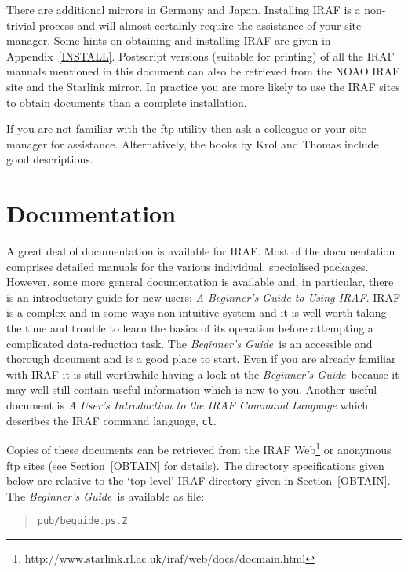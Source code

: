 \documentclass[twoside,11pt]{article}
\newcommand{\htmladdnormallinkfoot}[2]{#1\footnote{#2}}
\newcommand{\htmladdnormallink}[2]{#1}
\newcommand{\xlabel}[1]{}
\begin{document}
There are additional mirrors in Germany and Japan.
Installing IRAF is a non-trivial process and will almost certainly
require the assistance of your site manager.  Some hints on obtaining
and installing IRAF are given in Appendix~\ref{INSTALL}.  Postscript
versions (suitable for printing) of all the IRAF manuals mentioned in
this document can also be retrieved from the NOAO IRAF site and the
Starlink mirror.  In practice you are more likely to use the IRAF sites
to obtain documents than a complete installation.

If you are not familiar with the ftp utility then ask a colleague or
your site manager for assistance.  Alternatively, the books by
Krol\cite{KROL92} and Thomas\cite{THOMAS95} include good descriptions.


\section{\xlabel{DOC}\label{DOC}Documentation}

A great deal of \htmladdnormallink{documentation}
{http://iraf.noao.edu/iraf/web/docs/docmain.html}
is available for IRAF.  Most of the
documentation comprises detailed manuals for the various individual,
specialised packages.  However, some more general documentation is
available and, in particular, there is an introductory guide for new
users: {\it A Beginner's Guide to Using IRAF}\/\cite{BARNES93}.
IRAF is a complex and in some ways non-intuitive system and it is well
worth taking the time and trouble to learn the basics of its operation
before attempting a complicated data-reduction task.  The {\it
Beginner's Guide}\, is an accessible and thorough document and is a good
place to start.  Even if you are already familiar with IRAF it is still
worthwhile having a look at the {\it Beginner's Guide}\, because it may
well still contain useful information which is new to you.  Another
useful document is {\it A User's Introduction to the IRAF Command
Language}\/\cite{SHAMES86} which describes the IRAF command language,
{\tt cl}.

Copies of these documents can be retrieved from the IRAF 
\htmladdnormallinkfoot{Web}
{http://www.starlink.rl.ac.uk/iraf/web/docs/docmain.html}
or anonymous ftp sites (see Section~\ref{OBTAIN} for details).  The
directory specifications given below are relative to the `top-level' IRAF
directory given in Section~\ref{OBTAIN}.  The {\it Beginner's Guide}\, is
available as file:

\begin{quote}
{\tt pub/beguide.ps.Z}
\end{quote}
\end{document}

